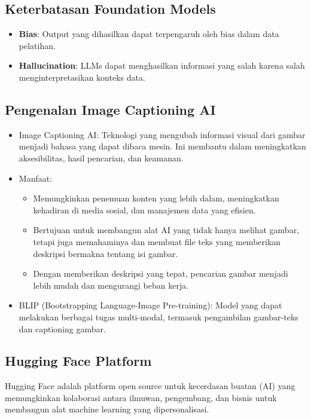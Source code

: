\documentclass{article}
\begin{document}
\subsection{Keterbatasan Foundation Models}
\begin{itemize}
    \item \textbf{Bias}: Output yang dihasilkan dapat terpengaruh oleh bias dalam data pelatihan.
    \item \textbf{Hallucination}: LLMs dapat menghasilkan informasi yang salah karena salah menginterpretasikan konteks data.
\end{itemize}


\subsection{Pengenalan Image Captioning AI}
\begin{itemize}
    \item Image Captioning AI: Teknologi yang mengubah informasi visual dari gambar menjadi bahasa yang dapat dibaca mesin. Ini membantu dalam meningkatkan aksesibilitas, hasil pencarian, dan keamanan.
    \item Manfaat:
          \begin{itemize}
              \item Memungkinkan penemuan konten yang lebih dalam, meningkatkan kehadiran di media sosial, dan manajemen data yang efisien.
              \item Bertujuan untuk membangun alat AI yang tidak hanya melihat gambar, tetapi juga memahaminya dan membuat file teks yang memberikan deskripsi bermakna tentang isi gambar.
              \item Dengan memberikan deskripsi yang tepat, pencarian gambar menjadi lebih mudah dan mengurangi beban kerja.
          \end{itemize}
    \item BLIP (Bootstrapping Language-Image Pre-training): Model yang dapat melakukan berbagai tugas multi-modal, termasuk pengambilan gambar-teks dan captioning gambar.
\end{itemize}

\subsection{Hugging Face Platform}
Hugging Face adalah platform open source untuk kecerdasan buatan (AI) yang memungkinkan kolaborasi antara ilmuwan, pengembang, dan bisnis untuk membangun alat machine learning yang dipersonalisasi.
\end{document}

